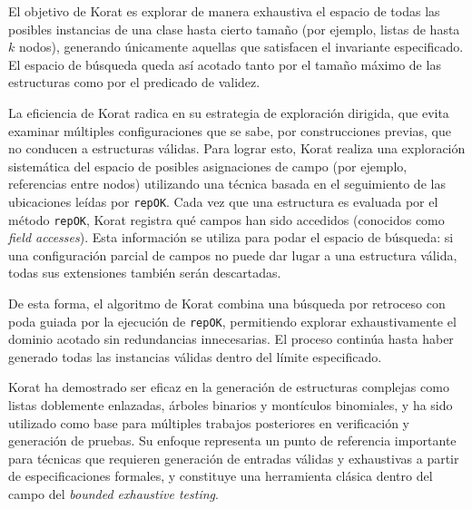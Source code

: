El objetivo de Korat es explorar de manera exhaustiva el espacio de todas las posibles instancias de una clase hasta cierto tamaño (por ejemplo, listas de hasta $k$ nodos), 
generando únicamente aquellas que satisfacen el invariante especificado. 
El espacio de búsqueda queda así acotado tanto por el tamaño máximo de las estructuras como por el predicado de validez.

La eficiencia de Korat radica en su estrategia de exploración dirigida, 
que evita examinar múltiples configuraciones que se sabe, por construcciones previas, que no conducen a estructuras válidas. 
Para lograr esto, Korat realiza una exploración sistemática del espacio de posibles asignaciones de campo (por ejemplo, referencias entre nodos) utilizando una técnica basada en el seguimiento de las ubicaciones leídas por \texttt{repOK}.
Cada vez que una estructura es evaluada por el método \texttt{repOK}, Korat registra qué campos han sido accedidos (conocidos como \emph{field accesses}). Esta información se utiliza para podar el espacio de búsqueda: si una configuración parcial de campos no puede dar lugar a una estructura válida, 
todas sus extensiones también serán descartadas.

De esta forma, el algoritmo de Korat combina una búsqueda por retroceso con poda guiada por la ejecución de \texttt{repOK}, permitiendo explorar exhaustivamente el dominio acotado sin redundancias innecesarias. El proceso continúa hasta haber generado todas las instancias válidas dentro del límite especificado.

Korat ha demostrado ser eficaz en la generación de estructuras complejas como listas doblemente enlazadas, árboles binarios y montículos binomiales, y ha sido utilizado como base para múltiples trabajos posteriores en verificación y generación de pruebas. Su enfoque representa un punto de referencia importante para técnicas que requieren generación de entradas válidas y exhaustivas a partir de especificaciones formales, y constituye una herramienta clásica dentro del campo del \emph{bounded exhaustive testing}.




